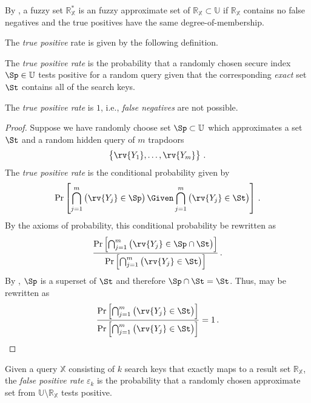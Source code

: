 \documentclass[ ../main.tex]{subfiles}
\begin{document}
By \Cref{}, a fuzzy set $\mathbb{R}_{\mathbb{X}}^*$ is an fuzzy approximate set of $\mathbb{R}_{\mathbb{X}} \subset \mathbb{U}$ if $\mathbb{R}_{\mathbb{X}}$ contains no false negatives and the true positives have the same degree-of-membership.

The \emph{true positive} rate is given by the following definition.
\begin{definition}
The \emph{true positive rate} is the probability that a randomly chosen secure index $\Sp \in \mathbb{U}$ tests positive for a random query given that the corresponding \emph{exact} set $\St$ contains all of the search keys.
\end{definition}

\begin{theorem}
The \emph{true positive rate} is $1$, i.e., \emph{false negatives} are not possible.
\end{theorem}
\begin{proof}
Suppose we have randomly choose set $\Sp \subset \mathbb{U}$ which approximates a set $\St$ and a random hidden query of $m$ trapdoors
\begin{equation}
    \left\{\rv{Y_1},\ldots,\rv{Y_m}\right\}\,.
\end{equation}
The \emph{true positive rate} is the conditional probability given by
\begin{equation}
    \Pr\left[\bigcap_{j=1}^{m} \left(\rv{Y_j} \in \Sp\right) \Given \bigcap_{j=1}^{m} \left(\rv{Y_j} \in \St\right)\right]\,.
\end{equation}
By the axioms of probability, this conditional probability be rewritten as
\begin{equation}
\label{eq:proof_tp_rate}
\frac
    {
        \Pr\left[\bigcap_{j=1}^{m} \left(\rv{Y_j} \in \Sp \cap \St\right)\right]
    }
    {
        \Pr\left[\bigcap_{j=1}^{m} \left(\rv{Y_j} \in \St\right)\right]
    }\,.
\end{equation}
By \Cref{}, $\Sp$ is a superset of $\St$ and therefore $\Sp \cap \St = \St$. Thus,  may be rewritten as
\begin{equation}
    \frac
    {
        \Pr\left[\bigcap_{j=1}^{m} \left(\rv{Y_j} \in \St\right)\right]}
    {
        \Pr\left[\bigcap_{j=1}^{m} \left(\rv{Y_j} \in \St\right)\right]
    } = 1\,.
\end{equation}
\end{proof}

\begin{definition}
Given a query $\mathbb{X}$ consisting of $k$ search keys that exactly maps to a result set $\mathbb{R}_{\mathbb{X}}$, the \emph{false positive rate} $\varepsilon_k$ is the probability that a randomly chosen approximate set from $\mathbb{U} \setminus \mathbb{R}_{\mathbb{X}}$ tests positive.
\end{definition}
\end{document}
